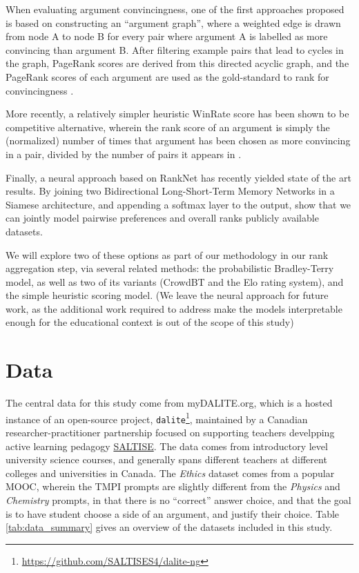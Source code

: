 \documentclass[notitlepage,12pt]{jedm}
\begin{document}
When evaluating argument convincingness, one of the first approaches proposed 
is based on constructing an ``argument graph'', where a weighted edge is drawn 
from node A to node B for every pair where argument A is labelled as more 
convincing than argument B. 
After filtering example pairs that lead to cycles in the graph, PageRank scores 
are derived from this directed acyclic graph, and the PageRank 
scores of each argument are used as the gold-standard to rank for 
convincingness \cite{habernal_which_2016}.

More recently, a relatively simpler heuristic WinRate score has been shown to 
be competitive alternative, wherein the rank score of an argument is simply the 
(normalized) number of times that argument has been chosen as more convincing 
in a pair, divided by the number of pairs it appears in
\cite{potash_ranking_2019}.

Finally, a neural approach based on RankNet has recently yielded state of the 
art results. By joining two Bidirectional Long-Short-Term Memory Networks in a 
Siamese architecture, and appending a softmax layer to the output, 
\cite{gleize_are_2019} show that we can jointly model pairwise preferences and 
overall ranks publicly available datasets.

We will explore two of these options as part of our methodology in our rank 
aggregation step, via several related methods: 
the probabilistic Bradley-Terry model, as well as two of its variants (CrowdBT 
and the Elo rating system), and the simple heuristic scoring model. 
(We leave the neural approach for future work, as the additional work required 
to address make the models interpretable enough for the educational context is 
out of the scope of this study)


\section{Data}\label{sec:datasets}

The central data for this study come from myDALITE.org, which is a hosted 
instance of 
an open-source project, 
\verb|dalite|\footnote{\url{https://github.com/SALTISES4/dalite-ng}}, 
maintained by a Canadian researcher-practitioner partnership focused on 
supporting teachers develpping active learning pedagogy 
\href{saltise.ca}{SALTISE}.
The data comes from introductory level university science courses, and 
generally spans different teachers at different colleges and universities in 
Canada. 
The \textit{Ethics} dataset comes from a popular MOOC, wherein the TMPI prompts 
are slightly different from the \textit{Physics} and \textit{Chemistry} 
prompts, in that there is no ``correct'' answer choice, and that the goal is to 
have student choose a side of an argument, and justify their choice.
Table \ref{tab:data_summary} gives an overview of the datasets included in this 
study.
\end{document}
